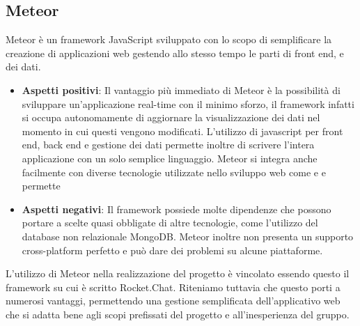 \subsection{Meteor}
Meteor è un framework JavaScript sviluppato con lo scopo di semplificare la creazione di applicazioni web gestendo allo stesso tempo le parti di front end,  e dei dati.
\begin{itemize}
	\item \textbf{Aspetti positivi}: Il vantaggio più immediato di Meteor è la possibilità di sviluppare un'applicazione real-time con il minimo sforzo, il framework infatti si occupa autonomamente di aggiornare la visualizzazione dei dati nel momento in cui questi vengono modificati. L'utilizzo di javascript per front end, back end e gestione dei dati permette inoltre di scrivere l'intera applicazione con un solo semplice linguaggio. Meteor si integra anche facilmente con diverse tecnologie utilizzate nello sviluppo web come  e  e permette  
	\item \textbf{Aspetti negativi}: Il framework possiede molte dipendenze che possono portare a scelte quasi obbligate di altre tecnologie, come l'utilizzo del database non relazionale MongoDB. Meteor inoltre non presenta un supporto cross-platform perfetto e può dare dei problemi su alcune piattaforme.
\end{itemize}
L'utilizzo di Meteor nella realizzazione del progetto è vincolato essendo questo il framework su cui è scritto Rocket.Chat. Riteniamo tuttavia che questo porti a numerosi vantaggi, permettendo una gestione semplificata dell'applicativo web che si adatta bene agli scopi prefissati del progetto e all'inesperienza del gruppo.

